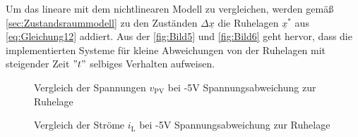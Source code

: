 Um das lineare mit dem nichtlinearen Modell zu vergleichen, werden gemäß \autoref{sec:Zustandsraummodell} zu den Zuständen $\Delta \underline{x}$ die Ruhelagen $\underline{x}^*$ aus \autoref{eq:Gleichung12} addiert. Aus der \autoref{fig:Bild5} und \autoref{fig:Bild6} geht hervor, dass die implementierten Systeme für kleine Abweichungen von der Ruhelagen mit steigender Zeit $"t"$ selbiges Verhalten aufweisen.

\begin{figure}[H]
   \centering
   \caption[Vergleich der Spannungen $v_{\mathrm{PV}}$]{Vergleich der Spannungen $v_{\mathrm{PV}}$ bei -5V Spannungsabweichung zur Ruhelage}
   \label{fig:Bild5}
\end{figure}

\begin{figure}[H]
   \centering
   \caption[Vergleich der Ströme $i_{\mathrm{L}}$]{Vergleich der Ströme $i_{\mathrm{L}}$ bei -5V Spannungsabweichung zur Ruhelage}
   \label{fig:Bild6}
\end{figure}
